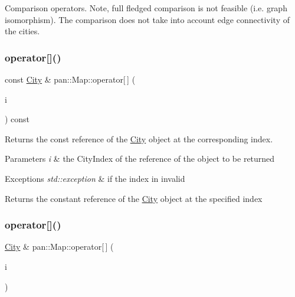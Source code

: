 Comparison operators. Note, full fledged comparison is not feasible (i.\+e. graph isomorphism). The comparison does not take into account edge connectivity of the cities. \mbox{\label{classpan_1_1_map_a0f7820b581ca27511a687618f01dce2d}} 
\subsubsection{\texorpdfstring{operator[]()}{operator[]()}\hspace{0.1cm}{\footnotesize\ttfamily [1/2]}}
{\footnotesize\ttfamily const \hyperlink{classpan_1_1_city}{City} \& pan\+::\+Map\+::operator\mbox{[}$\,$\mbox{]} (\begin{DoxyParamCaption}\item[{\hyperlink{namespacepan_afaed28aa6603153dcc062a028602d697}{City\+Index}}]{i }\end{DoxyParamCaption}) const\hspace{0.3cm}{\ttfamily [inline]}}

Returns the const reference of the \hyperlink{classpan_1_1_city}{City} object at the corresponding index. 
\begin{DoxyParams}{Parameters}
{\em i} & the City\+Index of the reference of the object to be returned \\
\hline
\end{DoxyParams}

\begin{DoxyExceptions}{Exceptions}
{\em std\+::exception} & if the index in invalid \\
\hline
\end{DoxyExceptions}
\begin{DoxyReturn}{Returns}
the constant reference of the \hyperlink{classpan_1_1_city}{City} object at the specified index 
\end{DoxyReturn}
\mbox{\label{classpan_1_1_map_ab9e03b7854710fdbd279e62c2494ef06}} 
\subsubsection{\texorpdfstring{operator[]()}{operator[]()}\hspace{0.1cm}{\footnotesize\ttfamily [2/2]}}
{\footnotesize\ttfamily \hyperlink{classpan_1_1_city}{City} \& pan\+::\+Map\+::operator\mbox{[}$\,$\mbox{]} (\begin{DoxyParamCaption}\item[{\hyperlink{namespacepan_afaed28aa6603153dcc062a028602d697}{City\+Index}}]{i }\end{DoxyParamCaption})\hspace{0.3cm}{\ttfamily [inline]}}

